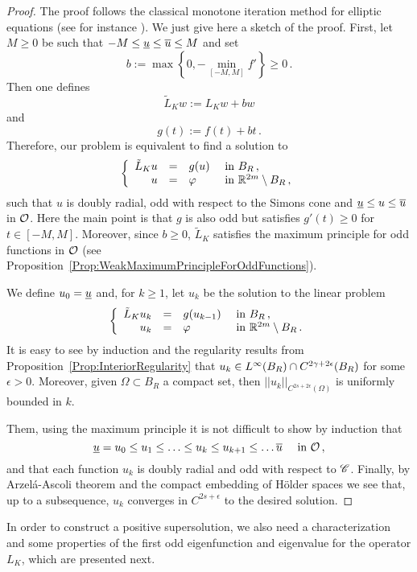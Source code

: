 \begin{proof}
	The proof follows the classical monotone iteration method for elliptic equations (see for instance \cite{Evans}). We just give here a sketch of the proof. 
	First, let $M \geq 0$ be such that $-M \leq \underline{u} \leq \overline{u} \leq M$ and set
	$$
	b := \max \left \{{0, - \min_{[-M,M]}f'}\right \}\geq 0\,.
	$$
	Then one defines 
	$$
	\tilde{L}_K w := L_Kw + b w
	$$
	and
	$$
	g(t) := f(t) + b t\,.
	$$
	Therefore, our problem is equivalent to find a solution to
	$$
	\left\{\begin{array}{rcll}
	\tilde{L}_Ku & = & g(u) & \textrm{ in } B_R\,, \\
	u &=& \varphi &  \textrm{ in } \mathbb{R}^{2m} \setminus B_R\,, 
	\end{array} \right.
	$$
	such that $u$ is doubly radial, odd with respect to the Simons cone and  $\underline{u} \leq u \leq \overline{u}$ in $\mathcal{O}$. Here the main point is that $g$ is also odd but satisfies $g'(t) \geq 0$ for $t \in [-M,M]$. Moreover, since $b \geq 0$, $\tilde{L}_K$ satisfies the maximum principle for odd functions in $\mathcal{O}$ (see Proposition~\ref{Prop:WeakMaximumPrincipleForOddFunctions}).
	
	We define $u_0 = \underline{u}$ and, for $k\geq 1$, let $u_k$ be the solution to the linear problem
	$$
	\left\{\begin{array}{rcll}
	\tilde{L}_K u_k & = & g(u_{k-1}) & \textrm{ in } B_R\,, \\
	u_k &=& \varphi &  \textrm{ in } \mathbb{R}^{2m} \setminus B_R\,. 
	\end{array} \right.
	$$
	It is easy to see by induction and the regularity results from Proposition~\ref{Prop:InteriorRegularity} that $u_k\in L^\infty(B_R) \cap C^{2\gamma+2\epsilon}(B_R)$ for some $\epsilon>0$. Moreover, given $\Omega\subset B_R$ a compact set, then $||u_k||_{C^{2s+2\epsilon}(\Omega)}$ is uniformly bounded in $k$.
	
	Them, using the maximum principle it is not difficult to show by induction that 
	$$
	\underline{u} = u_0 \leq u_1 \leq \ldots \leq u_k \leq u_{k+1} \leq \ldots \overline{u} \quad \text{ in }\mathcal{O}\,,
	$$
	and that each function $u_k$ is doubly radial and odd with respect to $\mathscr{C}$. Finally, by Arzelá-Ascoli theorem and the compact embedding of H\"older spaces we see that, up to a subsequence, $u_k$ converges in $C^{2s+\epsilon}$ to the desired solution.
\end{proof}

In order to construct a positive supersolution, we also need a characterization and some properties of the first odd eigenfunction and eigenvalue for the operator $L_K$, which are presented next.

